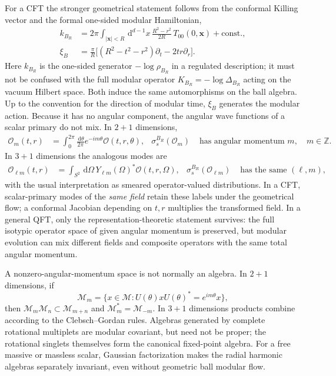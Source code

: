 \documentclass[a4paper,11pt]{article}
\theoremstyle{definition}
\newcommand{\dd}{\,\mathrm{d}}
\begin{document}
For a CFT the stronger geometrical statement follows from the
conformal Killing vector and the formal one-sided modular Hamiltonian,
\begin{align}
 k_{B_R}&=2\pi\int_{|\mathbf x|<R}\!\dd^{d-1}x\,
 \frac{R^2-r^2}{2R}\,T_{00}(0,\mathbf x)+\text{const.},\nonumber\\
 \xi_B&=\frac{\pi}{R}\big[(R^2-t^2-r^2)\partial_t
                         -2tr\partial_r\big].
 \label{eq:qft-ball-geometric-modular}
\end{align}
Here $k_{B_R}$ is the one-sided generator $-\log\rho_{B_R}$ in a
regulated description; it must not be confused with the full modular
operator $K_{B_R}=-\log\Delta_{B_R}$ acting on the vacuum Hilbert
space. Both induce the same automorphisms on the ball algebra.
Up to the convention for the direction of modular time, $\xi_B$
generates the modular action. Because it has no angular component, the
angular wave functions of a scalar primary do not mix. In $2+1$
dimensions,
\begin{align}
 \mathcal O_m(t,r)&=\int_0^{2\pi}\!\frac{\dd\theta}{2\pi}
  e^{-im\theta}\mathcal O(t,r,\theta),
 &\sigma_s^{B_R}(\mathcal O_m)&\text{ has angular momentum }m,
 \quad m\in\mathbb Z .
 \label{eq:qft-harmonics-3d}
\end{align}
In $3+1$ dimensions the analogous modes are
\begin{align}
 \mathcal O_{\ell m}(t,r)&=\int_{S^2}\!\dd\Omega\,
    Y_{\ell m}(\Omega)^*\mathcal O(t,r,\Omega),
 &\sigma_s^{B_R}(\mathcal O_{\ell m})
   &\text{ has the same }(\ell,m),
 \label{eq:qft-harmonics-4d}
\end{align}
with the usual interpretation as smeared operator-valued
distributions. In a CFT, scalar-primary modes of the \emph{same field}
retain these labels under the geometrical flow; a conformal Jacobian
depending on $t,r$ multiplies the transformed field. In a general QFT,
only the representation-theoretic statement survives: the full
isotypic operator space of given angular momentum is preserved, but
modular evolution can mix different fields and composite operators
with the same total angular momentum.

A nonzero-angular-momentum space is not normally an algebra. In
$2+1$ dimensions, if
\begin{equation}
 \mathcal M_m=\{x\in\mathcal M:
 U(\theta)xU(\theta)^*=e^{im\theta}x\},
\end{equation}
then $\mathcal M_m\mathcal M_n\subset\mathcal M_{m+n}$ and
$\mathcal M_m^*=\mathcal M_{-m}$. In $3+1$ dimensions products combine
according to the Clebsch--Gordan rules. Algebras generated by complete
rotational multiplets are modular covariant, but need not be proper;
the rotational singlets themselves form the canonical fixed-point
algebra. For a free massive or massless scalar, Gaussian factorization
makes the radial harmonic algebras separately invariant, even without
geometric ball modular flow.
\end{document}

